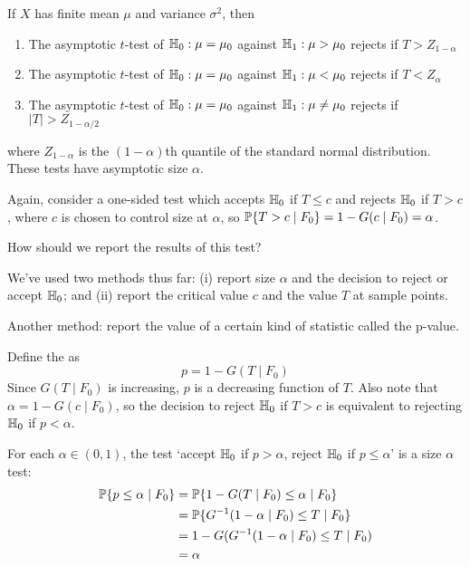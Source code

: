\documentclass[10pt]{article}
\begin{document}
\begin{theorem}
	If $X$ has finite mean $\mu$ and variance $\sigma^2$, then
	\begin{enumerate}
		\item The asymptotic $t$-test of $\mathbb{H}_0: \mu = \mu_0$ against $\mathbb{H}_1: \mu > \mu_0$ rejects if $T > Z_{1-\alpha}$
		\item The asymptotic $t$-test of $\mathbb{H}_0: \mu = \mu_0$ against $\mathbb{H}_1: \mu < \mu_0$ rejects if $T < Z_{\alpha}$
		\item The asymptotic $t$-test of $\mathbb{H}_0: \mu = \mu_0$ against $\mathbb{H}_1: \mu \ne \mu_0$ rejects if $|T| > Z_{1-\alpha / 2}$
	\end{enumerate}
	where $Z_{1-\alpha}$ is the $(1-\alpha)$th quantile of the standard normal distribution. These tests have asymptotic size $\alpha$.
\end{theorem}

Again, consider a one-sided test which accepts $\mathbb{H}_0$ if $T \le c$ and rejects $\mathbb{H}_0$ if $T > c$, where $c$ is chosen to control size at $\alpha$, so $\mathbb{P}\{T > c \mid F_0\} = 1 - G(c \mid F_0) = \alpha$. 

\begin{question}
	How should we report the results of this test?
\end{question}

We've used two methods thus far: (i) report size $\alpha$ and the decision to reject or accept $\mathbb{H}_0$; and (ii) report the critical value $c$ and the value $T$ at sample points.

Another method: report the value of a certain kind of statistic called the p-value.

\begin{definition}
	Define the  as
	\[
	p = 1 - G(T \mid F_0)
	\]
	Since $G(T \mid F_0)$ is increasing, $p$ is a decreasing function of $T$. Also note that $\alpha = 1 - G(c \mid F_0)$, so the decision to reject $\mathbb{H}_0$ if $T > c$ is equivalent to rejecting $\mathbb{H}_0$ if $p < \alpha$.
\end{definition}

For each $\alpha \in (0,1)$, the test `accept $\mathbb{H}_0$ if $p > \alpha$, reject $\mathbb{H}_0$ if $p \le \alpha$' is a size $\alpha$ test:
\begin{align*}
	\mathbb{P}\{p \le \alpha \mid F_0\} &= \mathbb{P}\{1 - G(T \mid F_0) \le \alpha \mid F_0\} \\
	&= \mathbb{P}\{ G^{-1}(1-\alpha \mid F_0) \le T \mid F_0\} \\
	&= 1 - G(G^{-1}(1-\alpha \mid F_0) \le T \mid F_0) \\
	&= \alpha
\end{align*}
\end{document}

